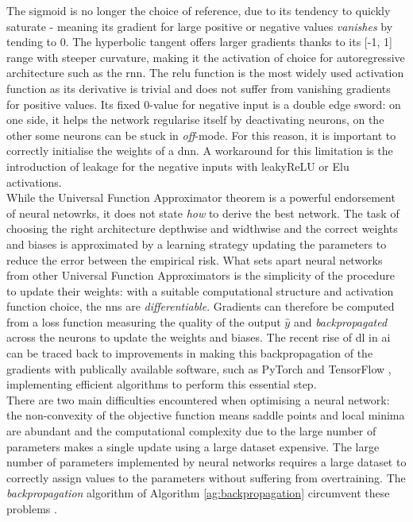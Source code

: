 The sigmoid is no longer the choice of reference, due to its tendency to quickly saturate - meaning its gradient for large positive or negative values \textit{vanishes} by tending to 0. The hyperbolic tangent offers larger gradients thanks to its [-1, 1] range with steeper curvature, making it the activation of choice for autoregressive architecture such as the \gls{rnn}. The \gls{relu} function is the most widely used activation function as its derivative is trivial and does not suffer from vanishing gradients for positive values. Its fixed 0-value for negative input is a double edge sword: on one side, it helps the network regularise itself by deactivating neurons, on the other some neurons can be stuck in \textit{off}-mode. For this reason, it is important to correctly initialise the weights of a \gls{dnn}. A workaround for this limitation is the introduction of leakage for the negative inputs with leakyReLU or Elu activations.\\

While the Universal Function Approximator theorem is a powerful endorsement of neural netowrks, it does not state \textit{how} to derive the best network. The task of choosing the right architecture depthwise and widthwise and the correct weights and biases is approximated by a learning strategy updating the parameters to reduce the error between the empirical risk. What sets apart neural networks from other Universal Function Approximators is the simplicity of the procedure to update their weights: with a suitable computational structure and activation function choice, the \glspl{nn} are \textit{differentiable}. Gradients can therefore be computed from a loss function measuring the quality of the output $\hat{y}$ and \textit{backpropagated} across the neurons to update the weights and biases. The recent rise of \gls{dl} in \gls{ai} can be traced back to improvements in making this backpropagation of the gradients with publically available software, such as PyTorch \cite{pytorch} and TensorFlow \cite{tensorflow2015-whitepaper}, implementing efficient algorithms to perform this essential step. \\

There are two main difficulties encountered when optimising a neural network: the non-convexity of the objective function means saddle points and local minima are abundant and the computational complexity due to the large number of parameters makes a single update using a large dataset expensive. The large number of parameters implemented by neural networks requires a large dataset to correctly assign values to the parameters without suffering from overtraining. The \textit{backpropagation} algorithm of Algorithm \ref{ag:backpropagation} circumvent these problems \cite{backprop}.

